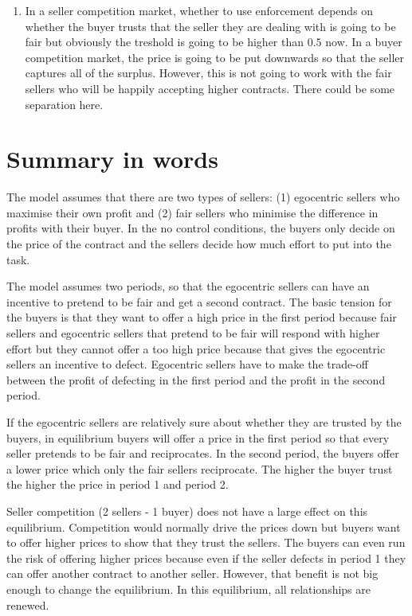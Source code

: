 \documentclass{article}
\begin{document}
\begin{enumerate}
\begin{enumerate}
        \item In a seller competition market, whether to use enforcement depends on whether the buyer trusts that the seller they are dealing with is going to be fair but obviously the treshold is going to be higher than $0.5$ now. In a buyer competition market, the price is going to be put downwards so that the seller captures all of the surplus. However, this is not going to work with the fair sellers who will be happily accepting higher contracts. There could be some separation here.
    \end{enumerate}
\end{enumerate}


\section{Summary in words}

The model assumes that there are two types of sellers: (1) egocentric sellers who maximise their own profit and (2) fair sellers who minimise the difference in profits with their buyer. In the no control conditions, the buyers only decide on the price of the contract and the sellers decide how much effort to put into the task. 

The model assumes two periods, so that the egocentric sellers can have an incentive to pretend to be fair and get a second contract. The basic tension for the buyers is that they want to offer a high price in the first period because fair sellers and egocentric sellers that pretend to be fair will respond with higher effort but they cannot offer a too high price because that gives the egocentric sellers an incentive to defect. Egocentric sellers have to make the trade-off between the profit of defecting in the first period and the profit in the second period.

If the egocentric sellers are relatively sure about whether they are trusted by the buyers, in equilibrium buyers will offer a price in the first period so that every seller pretends to be fair and reciprocates. In the second period, the buyers offer a lower price which only the fair sellers reciprocate. The higher the buyer trust the higher the price in period 1 and period 2. 

Seller competition (2 sellers - 1 buyer) does not have a large effect on this equilibrium. Competition would normally drive the prices down but buyers want to offer higher prices to show that they trust the sellers. The buyers can even run the risk of offering higher prices because even if the seller defects in period 1 they can offer another contract to another seller. However, that benefit is not big enough to change the equilibrium. In this equilibrium, all relationships are renewed.
\end{document}
